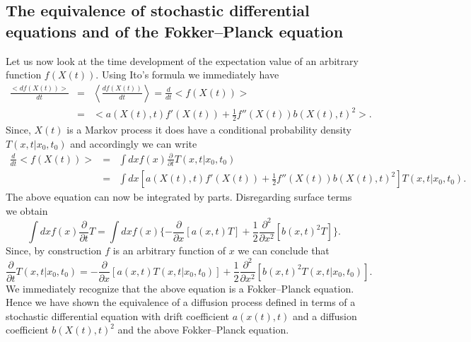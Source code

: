\subsection{The equivalence of stochastic differential equations 
and of the Fokker--Planck equation}
Let us now look at the time development of the expectation value 
of an arbitrary function
$f(X(t))$.
Using Ito's formula we immediately have
\begin{eqnarray*}
\frac{<df(X(t))>}{dt} & = & \left< \frac{df(X(t))}{dt} \right> = 
               \frac{d}{dt} <f(X(t)) > \\
       & = & < a(X(t),t) f'(X(t)) +   \frac{1}{2} f''(X(t)) b(X(t),t)^2   >.
\end{eqnarray*} 
Since, $X(t)$ is a Markov process it does have a conditional
probability density $T(x,t|x_0,t_0)$ and accordingly we can write
\begin{eqnarray*}
\frac{d}{dt} <f(X(t)) > &=& \int dx f(x) \frac{\partial}{\partial t} 
         T(x,t|x_0,t_0) \\
          & = & \int dx 
       [a(X(t),t) f'(X(t)) +   \frac{1}{2} f''(X(t)) b(X(t),t)^2] T(x,t|x_0,t_0).
\end{eqnarray*}
The above equation can now be integrated by parts. Disregarding
surface terms we obtain
\begin{equation*}
\int dx f(x) \frac{\partial}{\partial t} T = \int dx f(x)
   \{ - \frac{\partial}{\partial x}[a(x,t)T] + \frac{1}{2} 
        \frac{\partial^2}{\partial x^2}[b(x,t)^2 T] \}.
\end{equation*}
Since, by construction $f$ is an arbitrary function of $x$ we can
conclude that
\begin{equation*}
 \frac{\partial}{\partial t} T(x,t|x_0,t_0) =
    - \frac{\partial}{\partial x}[a(x,t)T(x,t|x_0,t_0)] + \frac{1}{2} 
        \frac{\partial^2}{\partial x^2}[b(x,t)^2 T(x,t|x_0,t_0)].
\end{equation*}
We immediately recognize that the above equation is a Fokker--Planck
equation. Hence we have shown the equivalence of a diffusion
process defined in terms of a stochastic differential equation with
drift coefficient $a(x(t),t)$ and a diffusion coefficient
$b(X(t),t)^2$ and the above Fokker--Planck equation.

